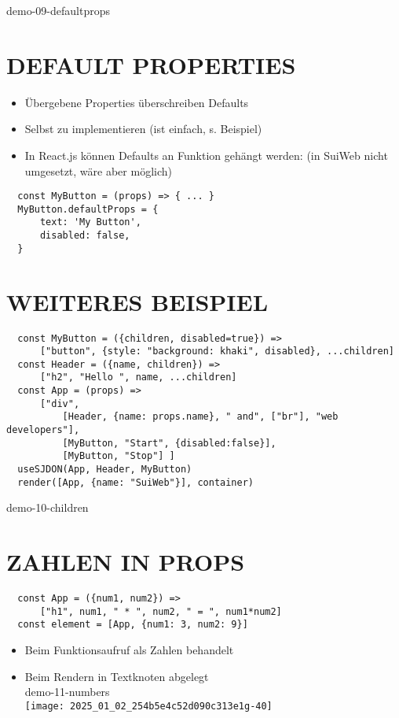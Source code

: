   demo-09-defaultprops
  
  \section*{DEFAULT PROPERTIES}
  \begin{itemize}
    \item Übergebene Properties überschreiben Defaults
    \item Selbst zu implementieren (ist einfach, s. Beispiel)
    \item In React.js können Defaults an Funktion gehängt werden: (in SuiWeb nicht umgesetzt, wäre aber möglich)
  \end{itemize}
  
  \begin{verbatim}
  const MyButton = (props) => { ... }
  MyButton.defaultProps = {
      text: 'My Button',
      disabled: false,
  }
  \end{verbatim}
  
  \section*{WEITERES BEISPIEL}
  \begin{verbatim}
  const MyButton = ({children, disabled=true}) =>
      ["button", {style: "background: khaki", disabled}, ...children]
  const Header = ({name, children}) =>
      ["h2", "Hello ", name, ...children]
  const App = (props) =>
      ["div",
          [Header, {name: props.name}, " and", ["br"], "web developers"],
          [MyButton, "Start", {disabled:false}],
          [MyButton, "Stop"] ]
  useSJDON(App, Header, MyButton)
  render([App, {name: "SuiWeb"}], container)
  \end{verbatim}
  
  demo-10-children
  
  \section*{ZAHLEN IN PROPS}
  \begin{verbatim}
  const App = ({num1, num2}) =>
      ["h1", num1, " * ", num2, " = ", num1*num2]
  const element = [App, {num1: 3, num2: 9}]
  \end{verbatim}
  
  \begin{itemize}
    \item Beim Funktionsaufruf als Zahlen behandelt
    \item Beim Rendern in Textknoten abgelegt\\
  demo-11-numbers\\
  \texttt{[image: 2025\_01\_02\_254b5e4c52d090c313e1g-40]}
  \end{itemize}
  
